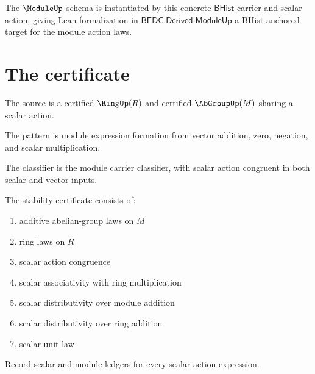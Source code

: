 The $\ModuleUp$ schema is instantiated by this concrete $\mathsf{BHist}$
carrier and scalar action, giving Lean formalization in
$\mathsf{BEDC.Derived.ModuleUp}$ a BHist-anchored target for the module action
laws.

\section{The certificate}

\begin{definition}
\label{def:module-source-specification}
The source is a certified $\RingUp(R)$ and certified $\AbGroupUp(M)$ sharing a scalar action.
\end{definition}

\begin{definition}
\label{def:module-pattern-specification}
The pattern is module expression formation from vector addition, zero, negation, and scalar multiplication.
\end{definition}

\begin{definition}
\label{def:module-classifier-specification}
The classifier is the module carrier classifier, with scalar action congruent in both scalar and vector inputs.
\end{definition}

\begin{definition}
\label{def:module-stability-certificate}
The stability certificate consists of:
\begin{enumerate}
  \item additive abelian-group laws on $M$
  \item ring laws on $R$
  \item scalar action congruence
  \item scalar associativity with ring multiplication
  \item scalar distributivity over module addition
  \item scalar distributivity over ring addition
  \item scalar unit law
\end{enumerate}
\end{definition}

\begin{definition}
\label{def:module-ledger-policy}
Record scalar and module ledgers for every scalar-action expression.
\end{definition}


